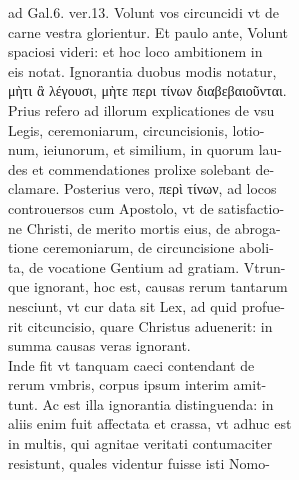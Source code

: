 \documentclass{article}
\begin{document}
\begin{pages}
                ad Gal.6. ver.13. Volunt vos circuncidi vt de \\
                carne vestra glorientur. Et paulo ante, Volunt \\
                spaciosi videri: et hoc loco ambitionem in \\
                eis notat. Ignorantia duobus modis notatur, \\
                μὴτι ἂ λέγουσι, μὴτε περι τίνων διαβεβαιοῦνται. \\
                Prius refero ad illorum explicationes de vsu \\
                Legis, ceremoniarum, circuncisionis, lotio- \\
                num, ieiunorum, et similium, in quorum lau- \\
                des et commendationes prolixe solebant de- \\
                clamare. Posterius vero, περὶ τίνων, ad locos \\
                controuersos cum Apostolo, vt de satisfactio- \\
                ne Christi, de merito mortis eius, de abroga- \\
                tione ceremoniarum, de circuncisione aboli- \\
                ta, de vocatione Gentium ad gratiam. Vtrun- \\
                que ignorant, hoc est, causas rerum tantarum \\
                nesciunt, vt cur data sit Lex, ad quid profue- \\
                rit citcuncisio, quare Christus aduenerit: in \\
                summa causas veras ignorant. \\
                Inde fit vt tanquam caeci contendant de \\
                rerum vmbris, corpus ipsum interim amit- \\
                tunt. Ac est illa ignorantia distinguenda: in \\
                aliis enim fuit affectata et crassa, vt adhuc est \\
                in multis, qui agnitae veritati contumaciter \\
                resistunt, quales videntur fuisse isti Nomo- \\

\end{pages}
\end{document}
